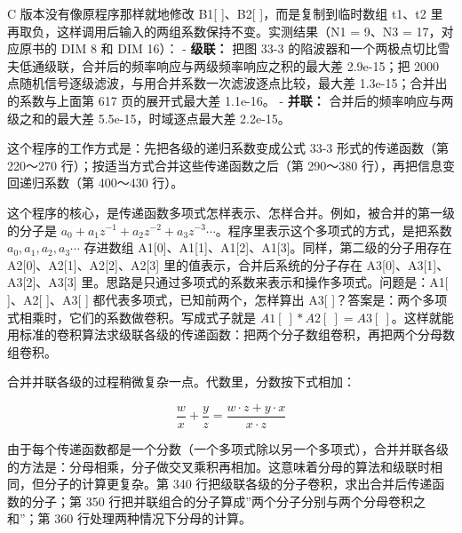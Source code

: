 \begin{Shaded}
\begin{Highlighting}[]
     \OperatorTok{(}\OperatorTok{=} \OperatorTok{;}\OperatorTok{\textless{}}\OperatorTok{;}\OperatorTok{++)}            
\OperatorTok{[}\OperatorTok{]} \OperatorTok{=} \OperatorTok{{-}}\OperatorTok{[}\OperatorTok{];}
\OperatorTok{[}\OperatorTok{]} \OperatorTok{=} \OperatorTok{;}                            
\OperatorTok{\}}
\end{Highlighting}
\end{Shaded}

C 版本没有像原程序那样就地修改 B1{[} {]}、B2{[} {]}，而是复制到临时数组
t1、t2 里再取负，这样调用后输入的两组系数保持不变。实测结果（N1 = 9、N3
= 17，对应原书的 DIM 8 和 DIM 16）： - \textbf{级联：} 把图 33-3
的陷波器和一个两极点切比雪夫低通级联，合并后的频率响应与两级频率响应之积的最大差
2.9e-15；把 2000
点随机信号逐级滤波，与用合并系数一次滤波逐点比较，最大差
1.3e-15；合并出的系数与上面第 617 页的展开式最大差 1.1e-16。 -
\textbf{并联：} 合并后的频率响应与两级之和的最大差
5.5e-15，时域逐点最大差 2.2e-15。

这个程序的工作方式是：先把各级的递归系数变成公式 33-3 形式的传递函数（第
220～270 行）；按适当方式合并这些传递函数之后（第 290～380
行），再把信息变回递归系数（第 400～430 行）。

这个程序的核心，是传递函数多项式怎样表示、怎样合并。例如，被合并的第一级的分子是
\(a_0 + a_1z^{-1} + a_2z^{-2} + a_3z^{-3} \cdots\)。程序里表示这个多项式的方式，是把系数
\(a_0, a_1, a_2, a_3 \cdots\) 存进数组
A1{[}0{]}、A1{[}1{]}、A1{[}2{]}、A1{[}3{]}。同样，第二级的分子用存在
A2{[}0{]}、A2{[}1{]}、A2{[}2{]}、A2{[}3{]}
里的值表示，合并后系统的分子存在
A3{[}0{]}、A3{[}1{]}、A3{[}2{]}、A3{[}3{]}
里。思路是只通过多项式的系数来表示和操作多项式。问题是：A1{[} {]}、A2{[}
{]}、A3{[} {]} 都代表多项式，已知前两个，怎样算出 A3{[}
{]}？答案是：两个多项式相乘时，它们的系数做卷积。写成式子就是
\(A1[\ ] * A2[\ ] = A3[\ ]\)。这样就能用标准的卷积算法求级联各级的传递函数：把两个分子数组卷积，再把两个分母数组卷积。

合并并联各级的过程稍微复杂一点。代数里，分数按下式相加：

\[\frac{w}{x} + \frac{y}{z} = \frac{w\cdot z + y\cdot x}{x\cdot z}\]

由于每个传递函数都是一个分数（一个多项式除以另一个多项式），合并并联各级的方法是：分母相乘，分子做交叉乘积再相加。这意味着分母的算法和级联时相同，但分子的计算更复杂。第
340 行把级联各级的分子卷积，求出合并后传递函数的分子；第 350
行把并联组合的分子算成''两个分子分别与两个分母卷积之和''；第 360
行处理两种情况下分母的计算。

